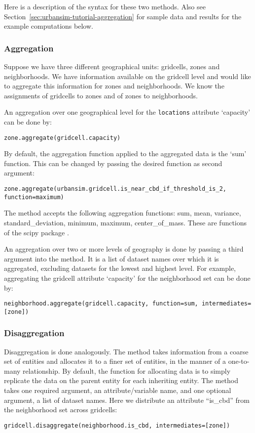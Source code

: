 Here is a description of the syntax for these two methods.  Also see 
Section~\ref{sec:urbansim-tutorial-aggregation} for sample data and results
for the example computations below.

\subsubsection{Aggregation}

Suppose we have three different geographical units: gridcells, zones and
neighborhoods.  We have information available on the gridcell level and
would like to aggregate this information for zones and neighborhoods. We
know the assignments of gridcells to zones and of zones to neighborhoods.

An aggregation over one geographical level for the \verb|locations|
attribute `capacity' can be done by: 
\begin{verbatim}
zone.aggregate(gridcell.capacity)
\end{verbatim}
By default, the aggregation function applied to the aggregated data is the
`sum' function. This can be changed by passing the desired function as second
argument:
\begin{verbatim}
zone.aggregate(urbansim.gridcell.is_near_cbd_if_threshold_is_2, function=maximum)
\end{verbatim}

The  method accepts the following aggregation functions:
sum, mean, variance, standard_deviation, minimum, maximum,
center_of_mass. These are functions of the scipy package
.

An aggregation over two or more levels of geography is done by passing a
third argument into the  method. It is a list of dataset
\datasetindex names over which it is aggregated, excluding datasets
\datasetindex for the lowest and highest level. For example, aggregating
the gridcell attribute \attributesindex `capacity' for the neighborhood set
can be done by: 
\begin{verbatim}
neighborhood.aggregate(gridcell.capacity, function=sum, intermediates=[zone])
\end{verbatim}

\subsubsection{Disaggregation}

Disaggregation is done analogously. The  method takes
information from a coarse set of entities and allocates it to a finer set of
entities, in the manner of a one-to-many relationship. By default, the function
for allocating data is to simply replicate the data on the parent entity for
each inheriting entity. The method takes one required argument, an
attribute/variable
\attributesindex\variablesindex name, and one optional argument, a list of
dataset \datasetindex names. Here we distribute an attribute
``is_cbd'' from the neighborhood set across gridcells:
\begin{verbatim}
gridcell.disaggregate(neighborhood.is_cbd, intermediates=[zone])
\end{verbatim}

